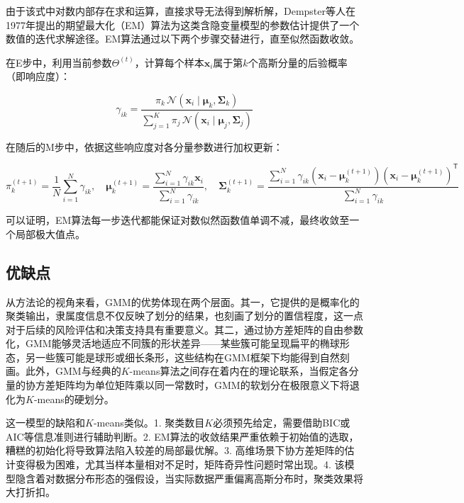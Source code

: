 \documentclass{article}
\begin{document}
由于该式中对数内部存在求和运算，直接求导无法得到解析解，Dempster等人在1977年提出的期望最大化（EM）算法为这类含隐变量模型的参数估计提供了一个数值的迭代求解途径。EM算法通过以下两个步骤交替进行，直至似然函数收敛。

在E步中，利用当前参数$\Theta^{(t)}$，计算每个样本$\boldsymbol{x}_i$属于第$k$个高斯分量的后验概率（即响应度）：

\begin{equation}
\gamma_{ik} = \frac{\pi_k \, \mathcal{N}(\boldsymbol{x}_i \mid \boldsymbol{\mu}_k, \boldsymbol{\Sigma}_k)}
{\sum_{j=1}^{K} \pi_j \, \mathcal{N}(\boldsymbol{x}_i \mid \boldsymbol{\mu}_j, \boldsymbol{\Sigma}_j)}
\end{equation}

在随后的M步中，依据这些响应度对各分量参数进行加权更新：

\begin{equation}
\pi_k^{(t+1)} = \frac{1}{N} \sum_{i=1}^{N} \gamma_{ik}, \quad
\boldsymbol{\mu}_k^{(t+1)} = \frac{\sum_{i=1}^{N} \gamma_{ik} \boldsymbol{x}_i}{\sum_{i=1}^{N} \gamma_{ik}}, \quad
\boldsymbol{\Sigma}_k^{(t+1)} = \frac{\sum_{i=1}^{N} \gamma_{ik} (\boldsymbol{x}_i - \boldsymbol{\mu}_k^{(t+1)})(\boldsymbol{x}_i - \boldsymbol{\mu}_k^{(t+1)})^{\mathsf{T}}}{\sum_{i=1}^{N} \gamma_{ik}}
\end{equation}

可以证明，EM算法每一步迭代都能保证对数似然函数值单调不减，最终收敛至一个局部极大值点。

\subsection{优缺点}

从方法论的视角来看，GMM的优势体现在两个层面。其一，它提供的是概率化的聚类输出，隶属度信息不仅反映了划分的结果，也刻画了划分的置信程度，这一点对于后续的风险评估和决策支持具有重要意义。其二，通过协方差矩阵的自由参数化，GMM能够灵活地适应不同簇的形状差异——某些簇可能呈现扁平的椭球形态，另一些簇可能是球形或细长条形，这些结构在GMM框架下均能得到自然刻画。此外，GMM与经典的$K$-means算法之间存在着内在的理论联系，当假定各分量的协方差矩阵均为单位矩阵乘以同一常数时，GMM的软划分在极限意义下将退化为$K$-means的硬划分。

这一模型的缺陷和$K$-means类似。1. 聚类数目$K$必须预先给定，需要借助BIC或AIC等信息准则进行辅助判断。2. EM算法的收敛结果严重依赖于初始值的选取，糟糕的初始化将导致算法陷入较差的局部最优解。3. 高维场景下协方差矩阵的估计变得极为困难，尤其当样本量相对不足时，矩阵奇异性问题时常出现。4. 该模型隐含着对数据分布形态的强假设，当实际数据严重偏离高斯分布时，聚类效果将大打折扣。
\end{document}
